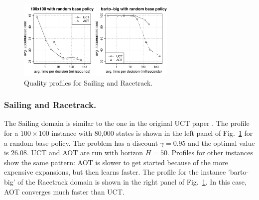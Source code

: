 \documentclass[letterpaper]{article}
\newcommand{\Omit}[1]{}
\begin{document}
\begin{figure}
\centering
\includegraphics[width=3in,clip=on,trim=.75cm 1cm 1.5cm 1cm]{combined.pdf}
\caption{Quality profiles for Sailing and Racetrack.}
\label{fig:combined}
\end{figure}

\subsubsection{Sailing and Racetrack.} The Sailing domain is  similar to the one %
in the original  UCT paper \cite{uct}. The profile for a $100\times 100$ instance with
80,000 states  is shown in the left panel of Fig.~\ref{fig:combined} for a random base
policy.
The problem has a discount $\gamma=0.95$ and the optimal value is $26.08$.
UCT and AOT are run with horizon $H=50$.
Profiles for other instances show the same pattern: AOT is slower
to get started because of the more expensive expansions, but then learns
faster.
The profile for the instance 'barto-big' of the Racetrack domain
\cite{barto:rtdp} is shown in the right panel of Fig.~\ref{fig:combined}.
In this case, AOT converges %
much faster than UCT.

\Omit{
.  The results are shown  in Fig.~\ref{fig:race:tradeoff}
for one of the standard instances. UCT was run for 10, 50, 100, 500, 1k, 5k, 10k iterations,
while AOT for 10, 50, 100, 500, 1k iterations.
The problem is undiscounted and $H$ is $50$. The same
base policies have been used. The problem has optimal value
of $26.13430$ and the  number of states is 22,534 states.}
\end{document}
